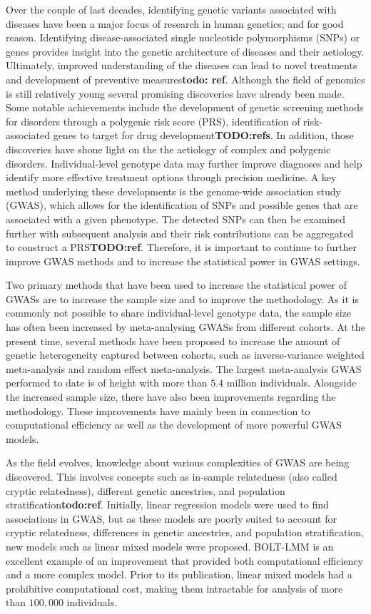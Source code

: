 
Over the couple of last decades, identifying genetic variants associated with diseases have been a major focus of research in human genetics; and for good reason. Identifying disease-associated single nucleotide polymorphisms (SNPs) or genes provides insight into the genetic architecture of diseases and their aetiology. Ultimately, improved understanding of the diseases can lead to novel treatments and development of preventive measures\textbf{todo: ref}. Although the field of genomics is still relatively young several promising discoveries have already been made. Some notable achievements include the development of genetic screening methods for disorders through a polygenic risk score (PRS), identification of risk-associated genes to target for drug development\textbf{TODO:refs}. In addition, those discoveries have shone light on the the aetiology of complex and polygenic disorders. Individual-level genotype data may further improve diagnoses and help identify more effective treatment options through precision medicine. A key method underlying these developments is the genome-wide association study (GWAS), which allows for the identification of SNPs and possible genes that are associated with a given phenotype. The detected SNPs can then be examined further with subsequent analysis and their risk contributions can be aggregated to construct a PRS\textbf{TODO:ref}. Therefore, it is important to continue to further improve GWAS methods and to increase the statistical power in GWAS settings.

Two primary methods that have been used to increase the statistical power of GWASs are to increase the sample size and to improve the methodology. As it is commonly not possible to share individual-level genotype data, the sample size has often been increased by meta-analysing GWASs from different cohorts. At the present time, several methods have been proposed to increase the amount of genetic heterogeneity captured between cohorts, such as inverse-variance weighted meta-analysis and random effect meta-analysis\cite{han2011random,willer2010metal}. The largest meta-analysis GWAS performed to date is of height with more than $ 5.4 $ million individuals\cite{yengo2022saturated}. Alongside the increased sample size, there have also been improvements regarding the methodology. These improvements have mainly been in connection to computational efficiency as well as the development of more powerful GWAS models. 

As the field evolves, knowledge about various complexities of GWAS are being discovered. This involves concepts such as in-sample relatedness (also called cryptic relatedness), different genetic ancestries, and population stratification\textbf{todo:ref}. Initially, linear regression models were used to find associations in GWAS, but as these models are poorly suited to account for cryptic relatedness, differences in genetic ancestries, and population stratification, new models such as linear mixed models were proposed. BOLT-LMM\cite{loh2015efficient} is an excellent example of an improvement that provided both computational efficiency and a more complex model. Prior to its publication, linear mixed models had a prohibitive computational cost, making them intractable for analysis of more than $ 100,000 $ individuals.

